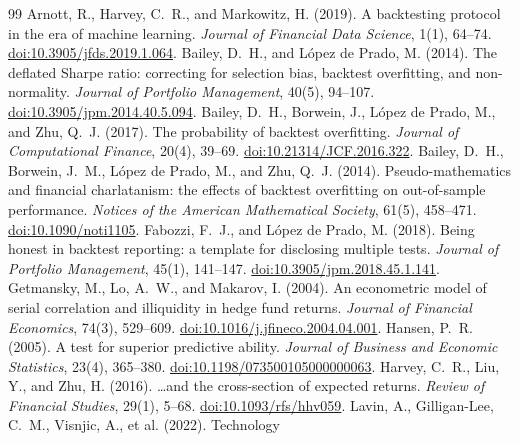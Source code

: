 \documentclass[11pt]{article}
\begin{document}
\begin{thebibliography}{99}
 Arnott, R., Harvey, C.~R., and Markowitz, H. (2019). A backtesting
protocol in the era of machine learning. \emph{Journal of Financial Data Science}, 1(1), 64--74. \href{https://doi.org/10.3905/jfds.2019.1.064}{doi:10.3905/jfds.2019.1.064}.
 Bailey, D.~H., and L\'opez de Prado, M. (2014). The deflated
Sharpe ratio: correcting for selection bias, backtest overfitting, and non-normality. \emph{Journal of Portfolio
Management}, 40(5), 94--107. \href{https://doi.org/10.3905/jpm.2014.40.5.094}{doi:10.3905/jpm.2014.40.5.094}.
 Bailey, D.~H., Borwein, J., L\'opez de Prado, M., and Zhu, Q.~J. (2017). The
probability of backtest overfitting. \emph{Journal of Computational Finance}, 20(4), 39--69. \href{https://doi.org/10.21314/JCF.2016.322}{doi:10.21314/JCF.2016.322}.
 Bailey, D.~H., Borwein, J.~M., L\'opez de Prado, M., and Zhu, Q.~J. (2014).
Pseudo-mathematics and financial charlatanism: the effects of backtest overfitting on out-of-sample performance.
\emph{Notices of the American Mathematical Society}, 61(5), 458--471. \href{https://doi.org/10.1090/noti1105}{doi:10.1090/noti1105}.
 Fabozzi, F.~J., and L\'opez de Prado, M. (2018). Being
honest in backtest reporting: a template for disclosing multiple tests. \emph{Journal of Portfolio Management}, 45(1),
141--147. \href{https://doi.org/10.3905/jpm.2018.45.1.141}{doi:10.3905/jpm.2018.45.1.141}.
 Getmansky, M., Lo, A.~W., and Makarov, I. (2004). An econometric model of
serial correlation and illiquidity in hedge fund returns. \emph{Journal of Financial Economics}, 74(3), 529--609. \href{https://doi.org/10.1016/j.jfineco.2004.04.001}{doi:10.1016/j.jfineco.2004.04.001}.
 Hansen, P.~R. (2005). A test for superior predictive ability. \emph{Journal of
Business and Economic Statistics}, 23(4), 365--380. \href{https://doi.org/10.1198/073500105000000063}{doi:10.1198/073500105000000063}.
 Harvey, C.~R., Liu, Y., and Zhu, H. (2016). \ldots and the cross-section of
expected returns. \emph{Review of Financial Studies}, 29(1), 5--68. \href{https://doi.org/10.1093/rfs/hhv059}{doi:10.1093/rfs/hhv059}.
 Lavin, A., Gilligan-Lee, C.~M., Visnjic, A., et al. (2022). Technology

\end{thebibliography}
\end{document}
